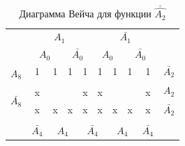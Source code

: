 \documentclass[a4paper,14pt]{article}
\begin{document}
\begin{table}[H]
\begin{minipage}{.5\linewidth}
		\centering
		\caption{Диаграмма Вейча для функции $\bar{\hat{A_2}}$}
		\begin{tabular}{cccccccccc}
			& \multicolumn{4}{c}{$A_1$}                                                                         & \multicolumn{4}{c}{$\bar{A_1}$}                                                                   &                        \\
			& \multicolumn{2}{c}{$A_0$}                       & \multicolumn{2}{c}{$\bar{A_0}$}                 & \multicolumn{2}{c}{$A_0$}                       & \multicolumn{2}{c}{$\bar{A_0}$}                 &                        \\ \cline{2-9}
			\multicolumn{1}{c|}{\multirow{2}{*}{$A_8$}}       & \multicolumn{1}{c|}{1} & \multicolumn{1}{c|}{1} & \multicolumn{1}{c|}{1} & \multicolumn{1}{c|}{1} & \multicolumn{1}{c|}{1} & \multicolumn{1}{c|}{1} & \multicolumn{1}{c|}{1} & \multicolumn{1}{c|}{1} & $\bar{A_2}$            \\ \cline{2-9}
			\multicolumn{1}{c|}{}                             & \multicolumn{1}{c|}{}  & \multicolumn{1}{c|}{}  & \multicolumn{1}{c|}{}  & \multicolumn{1}{c|}{}  & \multicolumn{1}{c|}{}  & \multicolumn{1}{c|}{}  & \multicolumn{1}{c|}{}  & \multicolumn{1}{c|}{}  & \multirow{2}{*}{$A_2$} \\ \cline{2-9}
			\multicolumn{1}{c|}{\multirow{2}{*}{$\bar{A_8}$}} & \multicolumn{1}{c|}{x} & \multicolumn{1}{c|}{}  & \multicolumn{1}{c|}{}  & \multicolumn{1}{c|}{x} & \multicolumn{1}{c|}{x} & \multicolumn{1}{c|}{}  & \multicolumn{1}{c|}{}  & \multicolumn{1}{c|}{x} &                        \\ \cline{2-9}
			\multicolumn{1}{c|}{}                             & \multicolumn{1}{c|}{x} & \multicolumn{1}{c|}{x} & \multicolumn{1}{c|}{x} & \multicolumn{1}{c|}{x} & \multicolumn{1}{c|}{x} & \multicolumn{1}{c|}{x} & \multicolumn{1}{c|}{x} & \multicolumn{1}{c|}{x} & $\bar{A_2}$            \\ \cline{2-9}
			\\
			& $\bar{A_4}$            & \multicolumn{2}{c}{$A_4$}                       & \multicolumn{2}{c}{$\bar{A_4}$}                 & \multicolumn{2}{c}{$A_4$}                       & $\bar{A_4}$            &                       
		\end{tabular}
	\end{minipage} 
\end{table}
\end{document}
